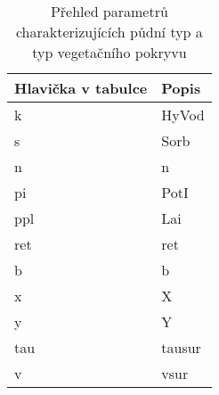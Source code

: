 \begin{table}%
  \centering
  \caption{Přehled parametrů charakterizujících půdní typ a typ vegetačního pokryvu}
  {\small
    \begin{tabular}{p{1.5cm}p{4cm}}
    \hline
    Hlavička v tabulce & Popis \\
    \hline \hline
    k  & \acl{HyVod} \\
    s  & \acl{Sorb} \\
    n & \acl{n}\\
    pi & \acl{PotI}\\
    ppl& \acl{Lai} \\
    ret& \acl{ret} \\
    b  & \acl{b} \\
    x  & \acl{X} \\
    y  & \acl{Y} \\
    tau  & \acl{tausur} \\
    v  & \acl{vsur} \\
    \hline
    \end{tabular}%
  }
  \label{tab:soilveg}%
\end{table}%